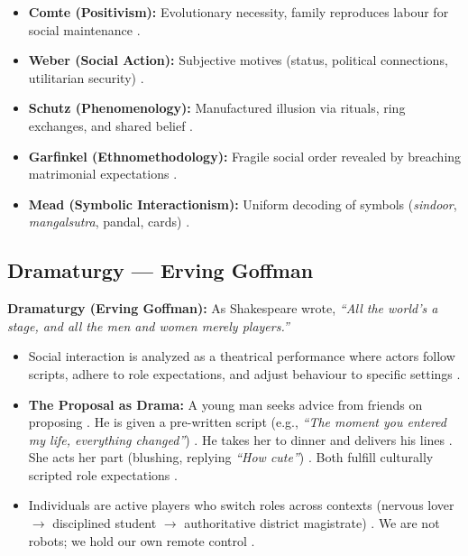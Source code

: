 \begin{QuickRevision}
\begin{itemize}
    \item \textbf{Comte (Positivism):} Evolutionary necessity, family reproduces labour for social maintenance .
    \item \textbf{Weber (Social Action):} Subjective motives (status, political connections, utilitarian security) .
    \item \textbf{Schutz (Phenomenology):} Manufactured illusion via rituals, ring exchanges, and shared belief .
    \item \textbf{Garfinkel (Ethnomethodology):} Fragile social order revealed by breaching matrimonial expectations .
    \item \textbf{Mead (Symbolic Interactionism):} Uniform decoding of symbols (\textit{sindoor}, \textit{mangalsutra}, pandal, cards) .
\end{itemize}
\end{QuickRevision}

\subsection{Dramaturgy --- Erving Goffman}

\begin{KeyConcept}
\textbf{Dramaturgy (Erving Goffman):} As Shakespeare wrote, \textit{``All the world's a stage, and all the men and women merely players.''} 
\begin{itemize}
    \item Social interaction is analyzed as a theatrical performance where actors follow scripts, adhere to role expectations, and adjust behaviour to specific settings .
    \item \textbf{The Proposal as Drama:} A young man seeks advice from friends on proposing . He is given a pre-written script (e.g., \textit{``The moment you entered my life, everything changed''}) . He takes her to dinner and delivers his lines . She acts her part (blushing, replying \textit{``How cute''}) . Both fulfill culturally scripted role expectations .
    \item Individuals are active players who switch roles across contexts (nervous lover $\rightarrow$ disciplined student $\rightarrow$ authoritative district magistrate) . We are not robots; we hold our own remote control .
\end{itemize}
\end{KeyConcept}


